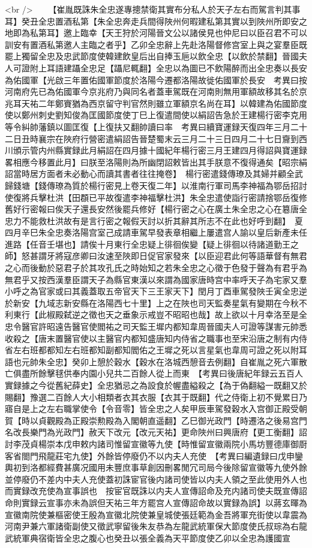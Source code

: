 <br />
　　【崔胤既誅朱全忠遂專摠禁衛其實布分私人於天子左右而駕言判其事耳】癸丑全忠置酒私第【朱全忠奔走兵間得陜州何暇建私第其實以到陜州所即安之地即為私第耳】邀上臨幸【天王狩於河陽晉文公以諸侯見也仲尼曰以臣召君不可以訓安有置酒私第邀人主臨之者乎】乙卯全忠辭上先赴洛陽督修宫室上與之宴羣臣既罷上獨留全忠及忠武節度使韓建飲皇后出自捧玉巵以飲全忠【以飲於禁翻】晉國夫人可證附上耳語建躡全忠足【躡尼輒翻】全忠以為圖已不飲陽醉而出全忠奏以長安為佑國軍【光啟三年置佑國軍節度於洛陽今遷都洛陽故徙佑國軍於長安　考異曰按河南府先已為佑國軍今京兆府乃與同名者蓋車駕既在河南則無用軍額故移其名於京兆耳天祐二年鄭賨猶為西京留守判官然則雖立軍額京名尚在耳】以韓建為佑國節度使以鄭州刺史劉知俊為匡國節度使丁巳上復遣間使以絹詔告急於王建楊行密李克用等令糾帥藩鎮以圖匡復【上復扶又翻帥讀曰率　考異曰續寶運録天復四年三月二十二日丑時襄宗在陜府行營密遣絹詔告晉楚蜀末云三月二十三日四月二十七日齎到西川頒示管内州縣實録此月絹詔在四月據十國紀年楊行密三月王建四月得詔與寶運録畧相應今移置此月】曰朕至洛陽則為所幽閉詔敕皆出其手朕意不復得通矣【昭宗絹詔當時居方面者未必動心而讀其書者往往掩卷】　楊行密遣錢傳璙及其婦并顧全武歸錢塘【錢傳璙為質於楊行密見上卷天復二年】以淮南行軍司馬李神福為鄂岳招討使復將兵擊杜洪【田頵已平故復遣李神福擊杜洪】朱全忠遣使詣行密請捨鄂岳復修舊好行密報曰俟天子還長安然後罷兵修好【楊行密之心在廣土朱全忠之心在簒唐全忠力不能救杜洪故有是言行密之報假天討以折其辭其所志不在此也好呼到翻】　夏四月辛巳朱全忠奏洛陽宫室己成請車駕早發表章相繼上屢遣宫人諭以皇后新產未任進路【任音壬堪也】請俟十月東行全忠疑上徘徊俟變【疑上徘徊以待諸道勤王之師】怒甚謂牙將寇彦卿曰汝速至陜即日促官家發來【以臣迎君此何等語華督有無君之心而後動於惡君子於其攻孔氏之時始知之若朱全忠之心徵于色發于聲為有君乎為無君乎又按西漢羣臣謂天子為縣官東漢以來謂為國家唐時宫中率呼天子為宅家又羣小呼之為官家或曰其義蓋取五帝官天下三王家天下】閏月丁酉車駕發陜壬寅全忠逆於新安【九域志新安縣在洛陽西七十里】上之在陜也司天監奏星氣有變期在今秋不利東行【此椒殿弑逆之徵也天之垂象示戒豈不昭昭也哉】故上欲以十月幸洛至是全忠令醫官許昭遠告醫官使閻祐之司天監王墀内都知韋周晉國夫人可證等謀害元帥悉收殺之【唐末置醫官使以主醫官内都知盛唐知内侍省之職事也至宋沿唐之制有内侍省左右班都都知左右班都知副都知閻佑之王墀之死以言星氣也韋周可證之死以附耳語也元帥朱全忠】癸卯上憩於穀水【穀水在洛城西憩音去例翻】自崔胤之死六軍散亡俱盡所餘擊毬供奉内園小兒共二百餘人從上而東　【考異曰後唐紀年録云五百人實録據之今從舊紀薛史】全忠猶忌之為設食於幄盡縊殺之【為于偽翻縊一既翻又於賜翻】豫選二百餘人大小相類者衣其衣服【衣其于既翻】代之侍衛上初不覺累日乃寤自是上之左右職掌使令【令音零】皆全忠之人矣甲辰車駕發穀水入宫御正殿受朝賀【時以貞觀殿為正殿崇勲殿為入閣朝直遥翻】乙巳御光政門【時遷洛之後易宫門名改長樂門為光政門】赦天下改元【改元天祐】更命陜州曰興唐府【更工衡翻】詔討李茂貞楊崇本戊申敕内諸司惟留宣徽等九使【時惟留宣徽兩院小馬坊豐德庫御㕑客省閤門飛龍莊宅九使】外餘皆停廢仍不以内夫人充使　【考異曰編遺録曰戊申鑾輿初到洛都經費甚廣况國用未豐庶事草創因刪畧閒冗司局今後除留宣徽等九使外餘並停廢仍不差内中夫人充使蓋初誅宦官後内諸司使皆以内夫人領之至此使用外人也而實録改充使為宣事誤也　按宦官既誅以内夫人宣傳詔命及充内諸司使夫既宣傳詔命則實録云宣事亦未為誤但天祐三年方罷宫人宣傳詔命故以實録為誤】以蔣玄暉為宣徽南院使兼樞密使王殷為宣徽北院使兼皇城使張廷範為金吾將軍充街使以韋震為河南尹兼六軍諸衛副使又徵武寧留後朱友恭為左龍武統軍保大節度使氏叔琮為右龍武統軍典宿衛皆全忠之腹心也癸丑以張全義為天平節度使乙卯以全忠為護國宣